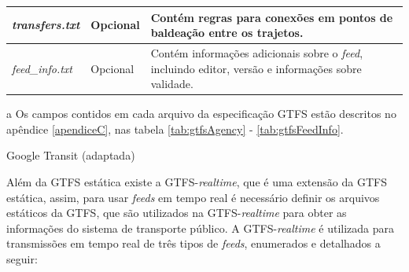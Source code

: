 \documentclass[
	12pt,				%
	oneside,			%
	a4paper,			%
	english,			%
	brazil				%
	]{abntex2ppgsi}
\begin{document}
\begin{table}[!htb]
\begin{threeparttable}
\begin{tabular}{>{\centering\arraybackslash}m{3.5cm} | >{\centering}m{3cm} | >{\centering\arraybackslash}m{8cm}}
\hline
\textit{transfers.txt }& Opcional & Contém regras para conexões em pontos de baldeação entre os trajetos. \\
\hline
\textit{feed\_info.txt} & Opcional & Contém informações adicionais sobre o \textit{feed}, incluindo editor, versão e informações sobre validade. \\
\bottomrule
  \end{tabular}
  \begin{tablenotes}
            \item[a] Os campos contidos em cada arquivo da especificação GTFS estão descritos no apêndice \ref{apendiceC}, nas tabela \ref{tab:gtfsAgency} - \ref{tab:gtfsFeedInfo}.
        \end{tablenotes}
\end{threeparttable}
 Google Transit (adaptada)
\end{table}

Além da GTFS estática existe a GTFS-\textit{realtime}, que é uma extensão da GTFS estática, assim, para usar \textit{feeds} em tempo real é necessário definir os arquivos estáticos da GTFS, que são utilizados na GTFS-\textit{realtime} para obter as informações do sistema de transporte público. A GTFS-\textit{realtime} é utilizada para transmissões em tempo real de três tipos de \textit{feeds}, enumerados e detalhados a seguir:
\end{document}
